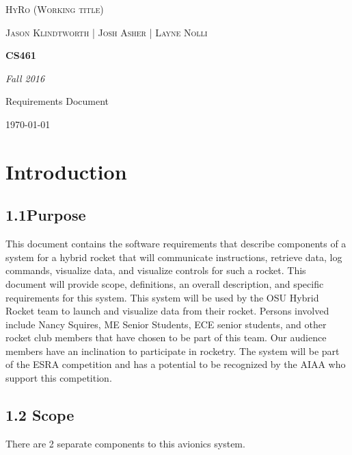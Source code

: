 \documentclass[10pt,draftclsnofoot,onecolumn]{IEEEtran}
\begin{document}
\begin{titlepage}
	\centering
	{\scshape\LARGE HyRo (Working title) \par}
	\vspace{1cm}
	{\scshape\Large Jason Klindtworth  |  Josh Asher  |   Layne Nolli\par}
	\vspace{1.5cm}
	{\huge\bfseries CS461\par}
	\vspace{2cm}
	{\Large\itshape Fall 2016\par}
	\vspace{4cm}
	{\large Requirements Document\par}
	\vfill

	{\large \today\par}
\end{titlepage}




\section{ Introduction}
\subsection{1.1Purpose}
 This document contains the software requirements that describe components of a system for a hybrid rocket that will communicate instructions, retrieve data, log commands,
 visualize data, and visualize controls for such a rocket.  This document will provide scope, definitions, an overall description, and specific requirements for this system.
 This system will be used by the OSU Hybrid Rocket team to launch and visualize data from their rocket. Persons involved include Nancy Squires, ME Senior Students, ECE senior students,
 and other rocket club members that have chosen to be part of this team. Our audience members have an inclination to participate in rocketry. The system will be part of the ESRA
 competition and has a potential to be recognized by the AIAA who support this competition.
\subsection{1.2 Scope}
 There are 2 separate components to this avionics system. 
\end{document}
